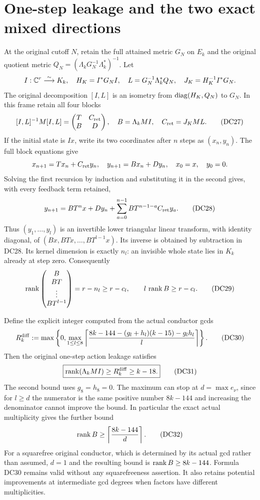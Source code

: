 \section{One-step leakage and the two exact mixed directions}
At the original cutoff $N$, retain the full attained metric $G_N$ on
$E_k$ and the original quotient metric
$Q_N=(\Lambda_kG_N^{-1}\Lambda_k^*)^{-1}$.  Let
\[
 I:\mathbb C^r\overset{\sim}{\longrightarrow}K_k,\quad
 H_K=I^*G_NI,\quad L=G_N^{-1}\Lambda_k^*Q_N,
 \quad J_K=H_K^{-1}I^*G_N.
\]
The original decomposition $[I,L]$ is an isometry from
$\operatorname{diag}(H_K,Q_N)$ to $G_N$.  In this frame retain all four blocks
\[
 [I,L]^{-1}M[I,L]=\begin{pmatrix}T&C_{\rm ret}\\B&D\end{pmatrix},
 \quad B=\Lambda_kMI,\quad C_{\rm ret}=J_KML.                    \tag{DC27}
\]
If the initial state is $Ix$, write its two coordinates after $n$
steps as $(x_n,y_n)$.  The full block equations give
\[
 x_{n+1}=Tx_n+C_{\rm ret}y_n,\quad
 y_{n+1}=Bx_n+Dy_n,\quad x_0=x,\quad y_0=0.
\]
Solving the first recursion by induction and substituting it in the
second gives, with every feedback term retained,
\[
 y_{n+1}=BT^nx+Dy_n+
            \sum_{a=0}^{n-1}BT^{n-1-a}C_{\rm ret}y_a.           \tag{DC28}
\]
Thus $(y_1,\ldots,y_l)$ is an invertible lower triangular linear
transform, with identity diagonal, of
$(Bx,BTx,\ldots,BT^{l-1}x)$.  Its inverse is obtained by subtraction
in DC28.  Its kernel dimension is exactly $n_l$: an invisible whole
state lies in $K_k$ already at step zero.  Consequently
\[
 \operatorname{rank}\begin{pmatrix}B\\BT\\\vdots\\BT^{l-1}\end{pmatrix}
   =r-n_l\ge r-c_l,\qquad
 l\,\operatorname{rank} B\ge r-c_l.                                           \tag{DC29}
\]

Define the explicit integer computed from the actual conductor gcds
\[
 R_k^{\rm diff}:=
 \max\left\{0,\max_{1\le l\le8}
 \left\lceil\frac{8k-144-(g_l+h_l)(k-15)-g_lh_l}{l}\right\rceil
                                                    \right\}.
                                                                    \tag{DC30}
\]
Then the original one-step action leakage satisfies
\[
 \boxed{\operatorname{rank}(\Lambda_kMI)\ge R_k^{\rm diff}\ge k-18.}          \tag{DC31}
\]
The second bound uses $g_8=h_8=0$.  The maximum can stop at
$d=\max e_\nu$, since for $l\ge d$ the numerator is the same
positive number $8k-144$ and increasing the denominator cannot
improve the bound.  In particular the exact actual multiplicity
gives the further bound
\[
 \operatorname{rank} B\ge\left\lceil\frac{8k-144}{d}\right\rceil.             \tag{DC32}
\]
For a squarefree original conductor, which is determined by its
actual gcd rather than assumed, $d=1$ and the resulting bound is
$\operatorname{rank} B\ge8k-144$.  Formula DC30 remains valid without any
squarefreeness assertion.  It also retains potential improvements
at intermediate gcd degrees when factors have different multiplicities.

